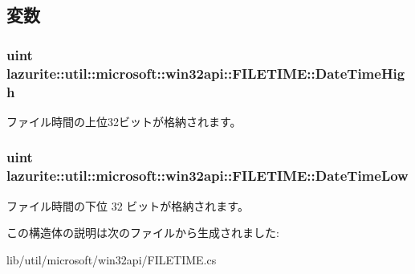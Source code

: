 \subsection{変数}
\hypertarget{structlazurite_1_1util_1_1microsoft_1_1win32api_1_1_f_i_l_e_t_i_m_e_aa23b42111459c4b9cabc53f411b84aa3}{
\subsubsection[{DateTimeHigh}]{\setlength{\rightskip}{0pt plus 5cm}uint {\bf lazurite::util::microsoft::win32api::FILETIME::DateTimeHigh}}}
\label{structlazurite_1_1util_1_1microsoft_1_1win32api_1_1_f_i_l_e_t_i_m_e_aa23b42111459c4b9cabc53f411b84aa3}


ファイル時間の上位32ビットが格納されます。 \hypertarget{structlazurite_1_1util_1_1microsoft_1_1win32api_1_1_f_i_l_e_t_i_m_e_ae3a6f99e4acb1756d2a42195408bb8ad}{
\subsubsection[{DateTimeLow}]{\setlength{\rightskip}{0pt plus 5cm}uint {\bf lazurite::util::microsoft::win32api::FILETIME::DateTimeLow}}}
\label{structlazurite_1_1util_1_1microsoft_1_1win32api_1_1_f_i_l_e_t_i_m_e_ae3a6f99e4acb1756d2a42195408bb8ad}


ファイル時間の下位 32 ビットが格納されます。 

この構造体の説明は次のファイルから生成されました:\begin{DoxyCompactItemize}
\item 
lib/util/microsoft/win32api/FILETIME.cs\end{DoxyCompactItemize}
